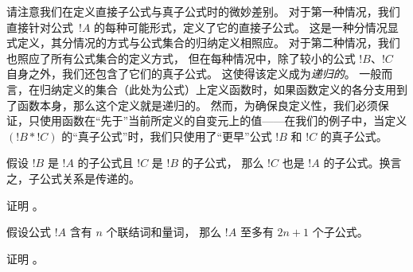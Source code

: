 \documentclass[../../../include/open-logic-section]{subfiles}
\begin{document}
\begin{explain}
请注意我们在定义直接子公式与真子公式时的微妙差别。
对于第一种情况，我们直接针对公式~$!A$ 的每种可能形式，定义了它的直接子公式。
这是一种分情况显式定义，其分情况的方式与公式集合的归纳定义相照应。
对于第二种情况，我们也照应了所有公式集合的定义方式，
但在每种情况中，除了较小的公式 $!B$、$!C$ 自身之外，我们还包含了它们的真子公式。
这使得该定义成为\emph{递归的}。
一般而言，在归纳定义的集合（此处为公式）上定义函数时，如果函数定义的各分支用到了函数本身，那么这个定义就是递归的。
然而，为确保良定义性，我们必须保证，只使用函数在“先于”当前所定义的自变元上的值——在我们的例子中，当定义 $(!B \ast !C)$ 的“真子公式”时，我们只使用了“更早”公式 $!B$ 和 $!C$ 的真子公式。
\end{explain}

\begin{prop}
假设 $!B$ 是 $!A$ 的子公式且 $!C$ 是 $!B$ 的子公式，
那么 $!C$ 也是 $!A$ 的子公式。换言之，子公式关系是传递的。
\end{prop}

\begin{prob}
证明 。
\end{prob}

\begin{prop}
假设公式 $!A$ 含有 $n$ 个联结词和量词，
那么 $!A$ 至多有 $2n+1$ 个子公式。
\end{prop}

\begin{prob}
证明 。
\end{prob}
\end{document}
